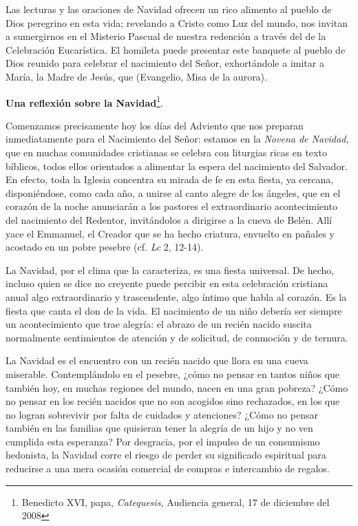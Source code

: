 \begin{body}
\begin{body}
Las lecturas y las oraciones de Navidad ofrecen un rico alimento al pueblo de Dios peregrino en esta vida; revelando a Cristo como Luz del mundo, nos invitan a sumergirnos en el Misterio Pascual de nuestra redención a través del  de la Celebración Eucarística. El homileta puede presentar este banquete al pueblo de Dios reunido para celebrar el nacimiento del Señor, exhortándole a imitar a María, la Madre de Jesús, que  (Evangelio, Misa de la aurora).

\textbf{Una reflexión sobre la Navidad}\footnote{Benedicto XVI, papa, \emph{Catequesis,} Audiencia general, 17 de diciembre del 2008}.

Comenzamos precisamente hoy los días del Adviento que nos preparan inmediatamente para el Nacimiento del Señor: estamos en la \emph{Novena de Navidad,} que en muchas comunidades cristianas se celebra con liturgias ricas en texto bíblicos, todos ellos orientados a alimentar la espera del nacimiento del Salvador. En efecto, toda la Iglesia concentra su mirada de fe en esta fiesta, ya cercana, disponiéndose, como cada año, a unirse al canto alegre de los ángeles, que en el corazón de la noche anunciarán a los pastores el extraordinario acontecimiento del nacimiento del Redentor, invitándolos a dirigirse a la cueva de Belén. Allí yace el Emmanuel, el Creador que se ha hecho criatura, envuelto en pañales y acostado en un pobre pesebre (cf. \emph{Lc} 2, 12-14).

La Navidad, por el clima que la caracteriza, es una fiesta universal. De hecho, incluso quien se dice no creyente puede percibir en esta celebración cristiana anual algo extraordinario y trascendente, algo íntimo que habla al corazón. Es la fiesta que canta el don de la vida. El nacimiento de un niño debería ser siempre un acontecimiento que trae alegría: el abrazo de un recién nacido suscita normalmente sentimientos de atención y de solicitud, de conmoción y de ternura.

La Navidad es el encuentro con un recién nacido que llora en una cueva miserable. Contemplándolo en el pesebre, ¿cómo no pensar en tantos niños que también hoy, en muchas regiones del mundo, nacen en una gran pobreza? ¿Cómo no pensar en los recién nacidos que no son acogidos sino rechazados, en los que no logran sobrevivir por falta de cuidados y atenciones? ¿Cómo no pensar también en las familias que quisieran tener la alegría de un hijo y no ven cumplida esta esperanza? Por desgracia, por el impulso de un consumismo hedonista, la Navidad corre el riesgo de perder su significado espiritual para reducirse a una mera ocasión comercial de compras e intercambio de regalos.


\end{body}
\end{body}
